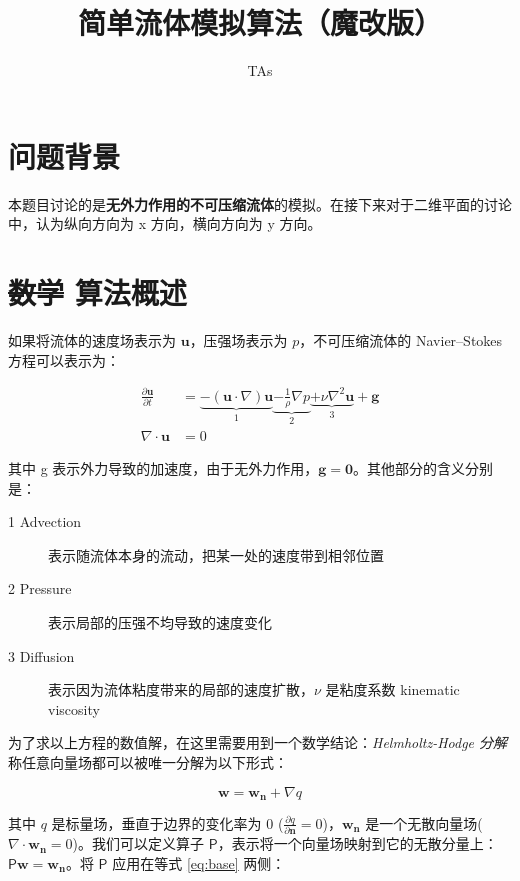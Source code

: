 \documentclass{ctexart}
\title{简单流体模拟算法（魔改版）}
\author{TAs}
\begin{document}
\maketitle

\section{问题背景}

\label{sec:bg}

本题目讨论的是\textbf{无外力作用的不可压缩流体}的模拟。在接下来对于二维平面的讨论中，认为纵向方向为 x 方向，横向方向为 y 方向。

\section{\sout{数学} 算法概述}

如果将流体的速度场表示为 $\mathbf{u}$，压强场表示为 $p$，不可压缩流体的 Navier–Stokes 方程可以表示为：

\begin{equation}
\begin{split}
\label{eq:base}
\frac{\partial \mathbf{u}}{\partial t} & = \underbrace{- (\mathbf{u} \cdot \nabla) \mathbf{u}}_1 \underbrace{- \frac{1}{\rho} \nabla p}_2 \underbrace{+ \nu \nabla^2 \mathbf{u}}_3 + \mathbf{g} \\
\nabla \cdot \mathbf{u} & = 0
\end{split}
\end{equation}

其中 g 表示外力导致的加速度，由于无外力作用，$\mathbf{g} = \mathbf{0}$。其他部分的含义分别是：

\begin{description}
  \item[1 Advection] 表示随流体本身的流动，把某一处的速度带到相邻位置
  \item[2 Pressure] 表示局部的压强不均导致的速度变化
  \item[3 Diffusion] 表示因为流体粘度带来的局部的速度扩散，$\nu$ 是粘度系数 kinematic viscosity
\end{description}

为了求以上方程的数值解，在这里需要用到一个数学结论：\textit{Helmholtz-Hodge 分解} 称任意向量场都可以被唯一分解为以下形式：

\begin{equation}
\label{eq:p-operator}
\mathbf{w} = \mathbf{w_n} + \nabla q
\end{equation}

其中 $q$ 是标量场，垂直于边界的变化率为 0 ($\frac{\partial q}{\partial \mathbf{n}} = 0$)，$\mathbf{w_n}$ 是一个无散向量场($\nabla \cdot \mathbf{w_n} = 0$)。我们可以定义算子 $\mathsf{P}$，表示将一个向量场映射到它的无散分量上：$\mathsf{P} \mathbf{w} = \mathbf{w_n}$。将 $\mathsf{P}$ 应用在等式 \ref{eq:base} 两侧：
\end{document}
